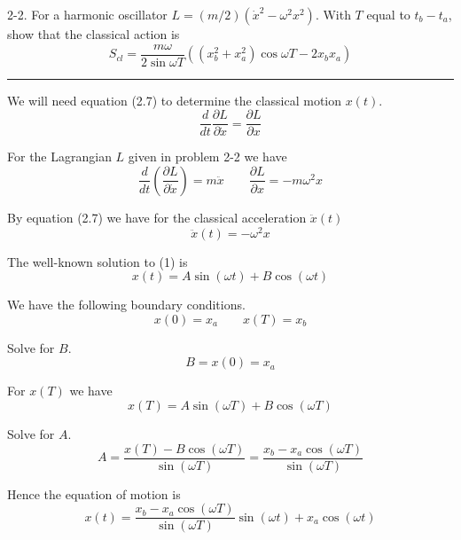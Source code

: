 \documentclass[12pt]{article}
\begin{document}
2-2.
For a harmonic oscillator $L=(m/2)(\dot x^2-\omega^2x^2)$.
With $T$ equal to $t_b-t_a$, show that the classical action is
\begin{equation*}
S_{cl}=\frac{m\omega}{2\sin\omega T}
\left(\left(x_b^2+x_a^2\right)\cos\omega T-2x_bx_a\right)
\tag{2.9}
\end{equation*}

\bigskip
\hrule

\bigskip
We will need equation (2.7) to determine the classical motion $x(t)$.
\begin{equation*}
\frac{d}{dt}\frac{\partial L}{\partial\dot x}=\frac{\partial L}{\partial x}
\tag{2.7}
\end{equation*}

For the Lagrangian $L$ given in problem 2-2 we have
\begin{equation*}
\frac{d}{dt}\left(\frac{\partial L}{\partial\dot x}\right)=m\ddot x
\qquad
\frac{\partial L}{\partial x}=-m\omega^2x
\end{equation*}

By equation (2.7) we have for the classical acceleration $\ddot x(t)$
\begin{equation*}
\ddot x(t)=-\omega^2x
\tag{1}
\end{equation*}

The well-known solution to (1) is
\begin{equation*}
x(t)=A\sin(\omega t)+B\cos(\omega t)
\end{equation*}

We have the following boundary conditions.
\begin{equation*}
x(0)=x_a
\qquad
x(T)=x_b
\end{equation*}

Solve for $B$.
\begin{equation*}
B=x(0)=x_a
\end{equation*}

For $x(T)$ we have
\begin{equation*}
x(T)=A\sin(\omega T)+B\cos(\omega T)
\end{equation*}

Solve for $A$.
\begin{equation*}
A=\frac{x(T)-B\cos(\omega T)}{\sin(\omega T)}=
\frac{x_b-x_a\cos(\omega T)}{\sin(\omega T)}
\end{equation*}

Hence the equation of motion is
\begin{equation*}
x(t)=\frac{x_b-x_a\cos(\omega T)}{\sin(\omega T)}\sin(\omega t)+x_a\cos(\omega t)
\tag{2}
\end{equation*}
\end{document}
